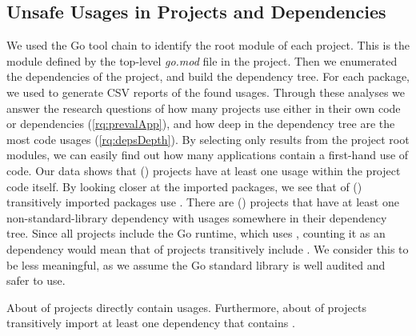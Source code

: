 
\subsection{Unsafe Usages in Projects and Dependencies}
\label{sec:eval:unsafewild}

We used the Go tool chain to identify the root module of each project. 
This is the module defined by the top-level \textit{go.mod} file in the project.
Then we enumerated the dependencies of the project, and build the dependency tree.
For each package, we used \toolUsage{} to generate CSV reports of the found \unsafe{} usages.
Through these analyses we answer the research questions of how many projects use \unsafe{} either in their own code or dependencies (\ref{rq:prevalApp}), and how deep in the dependency tree are the most \unsafe{} code usages (\ref{rq:depsDepth}). 
By selecting only results from the project root modules, we can easily find out how many applications contain a first-hand use of \unsafe{} code.
Our data shows that  () projects have at least one \unsafe{} usage within the project code itself.
By looking closer at the imported packages, we see that  of  () transitively imported packages use \unsafe{}. 
There are  () projects that have at least one non-standard-library dependency with \unsafe{} usages somewhere in their dependency tree.
Since all projects include the Go runtime, which uses \unsafe{}, counting it as an \unsafe{} dependency would mean that  of projects transitively include \unsafe{}.
We consider this to be less meaningful, as we assume the Go standard library is well audited and safer to use.

\begin{tcolorbox}[boxsep=1pt, enlarge top by=5pt, title=Answer to \ref{rq:prevalApp}]
About  of projects directly contain \unsafe{} usages.
Furthermore, about  of projects transitively import at least one dependency that contains \unsafe{}.
\end{tcolorbox}

